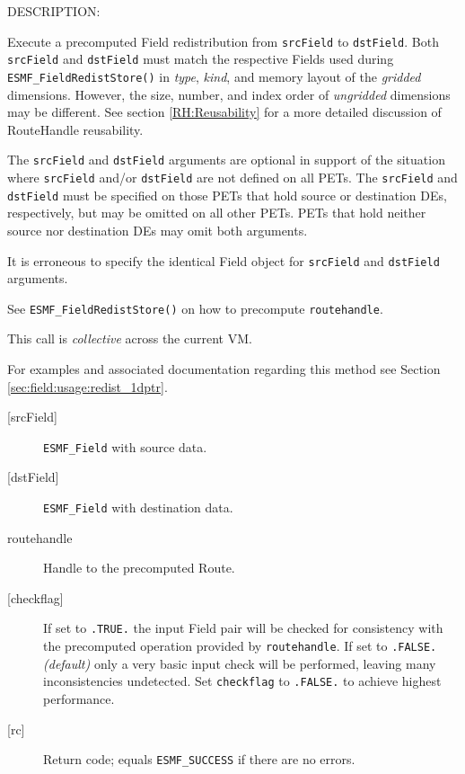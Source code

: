 {\sf DESCRIPTION:\\ }


     Execute a precomputed Field redistribution from {\tt srcField} to
     {\tt dstField}. 
     Both {\tt srcField} and {\tt dstField} must match the respective Fields
     used during {\tt ESMF\_FieldRedistStore()} in {\em type}, {\em kind}, and 
     memory layout of the {\em gridded} dimensions. However, the size, number, 
     and index order of {\em ungridded} dimensions may be different. See section
     \ref{RH:Reusability} for a more detailed discussion of RouteHandle 
     reusability.
  
     The {\tt srcField} and {\tt dstField} arguments are optional in support of
     the situation where {\tt srcField} and/or {\tt dstField} are not defined on
     all PETs. The {\tt srcField} and {\tt dstField} must be specified on those
     PETs that hold source or destination DEs, respectively, but may be omitted
     on all other PETs. PETs that hold neither source nor destination DEs may
     omit both arguments.
  
     It is erroneous to specify the identical Field object for {\tt srcField} and
     {\tt dstField} arguments.
  
     See {\tt ESMF\_FieldRedistStore()} on how to precompute 
     {\tt routehandle}.
  
     This call is {\em collective} across the current VM.
  
     For examples and associated documentation regarding this method see Section
     \ref{sec:field:usage:redist_1dptr}. 
  
     \begin{description}
     \item [{[srcField]}]
       {\tt ESMF\_Field} with source data.
     \item [{[dstField]}]
       {\tt ESMF\_Field} with destination data.
     \item [routehandle]
       Handle to the precomputed Route.
     \item [{[checkflag]}]
       If set to {\tt .TRUE.} the input Field pair will be checked for
       consistency with the precomputed operation provided by {\tt routehandle}.
       If set to {\tt .FALSE.} {\em (default)} only a very basic input check
       will be performed, leaving many inconsistencies undetected. Set
       {\tt checkflag} to {\tt .FALSE.} to achieve highest performance.
     \item [{[rc]}]
       Return code; equals {\tt ESMF\_SUCCESS} if there are no errors.
     \end{description}
   
